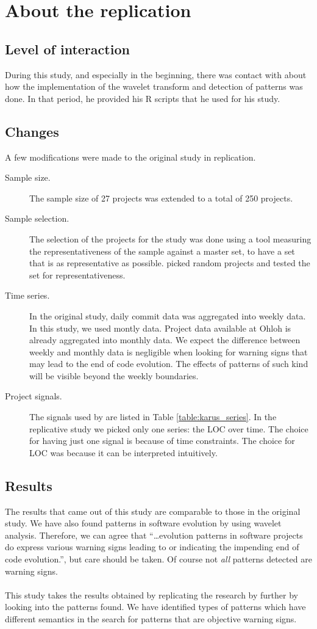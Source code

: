 \section{About the replication}
\subsection{Level of interaction}
During this study, and especially in the beginning, there was contact with
\citeauthor{karus2013} about how the implementation of the wavelet transform and
detection of patterns was done. In that period, he provided his R scripts that
he used for his study.

\subsection{Changes}
A few modifications were made to the original study in replication.
\begin{description}
	\item[Sample size.] The sample size of 27 projects was extended to a total of
	250 projects.
	
	\item[Sample selection.] The selection of the projects for the study was done
	using a tool measuring the representativeness of the sample against a master
	set, to have a set that is as representative as possible.
	\citeauthor{karus2013} picked random projects and tested the set for
	representativeness.
	
	\item[Time series.] In the original study, daily commit data was aggregated
	into weekly data. In this study, we used montly data. Project data available at
	Ohloh is already aggregated into monthly data. We expect the difference between
	weekly and monthly data is negligible when looking for warning signs that may
	lead to the end of code evolution. The effects of patterns of such kind will be
	visible beyond the weekly boundaries.
	
	\item[Project signals.] The signals used by \citeauthor{karus2013} are listed
	in Table \ref{table:karus_series}. In the replicative study we picked only one
	series: the LOC over time. The choice for having just one signal is because of
	time constraints. The choice for LOC was because it can be interpreted
	intuitively.
\end{description}

\subsection{Results}
The results that came out of this study are comparable to those in the original
study. We have also found patterns in software evolution by using wavelet
analysis. Therefore, we can agree that ``\ldots evolution patterns in software
projects do express various warning signs leading to or indicating the impending end of
code evolution.'', but care should be taken. Of course not \emph{all }\rm
patterns detected are warning signs.

\paragraph{}
This study takes the results obtained by replicating the research by
\citeauthor{karus2013} further by looking into the patterns found. We have
identified types of patterns which have different semantics in the search for
patterns that are objective warning signs.